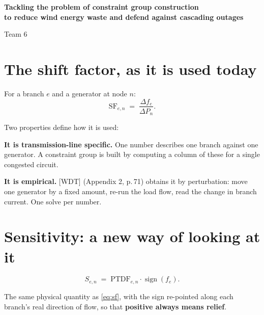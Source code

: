 \documentclass[11pt,a4paper]{article}
\begin{document}
\thispagestyle{empty}
\vspace*{\fill}
\begin{center}
{\LARGE\bfseries Tackling the problem of constraint group construction\\[3mm]
to reduce wind energy waste and defend against cascading outages}

\vspace{10mm}
{\large Team 6}
\end{center}
\vspace*{\fill}
\newpage



\section{The shift factor, as it is used today}

For a branch $e$ and a generator at node $n$:
\begin{equation}
  \text{SF}_{e,n} \;=\; \frac{\Delta f_e}{\Delta P_n}.
  \label{eq:sf}
\end{equation}

Two properties define how it is used:

\medskip
\textbf{It is transmission-line specific.} One number describes one branch
against one generator. A constraint group is built by computing a column of
these for a single congested circuit.

\medskip
\textbf{It is empirical.} [WDT] (Appendix 2, p.\,71) obtains it by
perturbation: move one generator by a fixed amount, re-run the load flow, read
the change in branch current. One solve per number.

\newpage
\section{Sensitivity: a new way of looking at it}

\begin{equation}
  S_{e,n} \;=\; \text{PTDF}_{e,n}\cdot\operatorname{sign}(f_e).
  \label{eq:sens}
\end{equation}

The same physical quantity as \eqref{eq:sf}, with the sign re-pointed along
each branch's real direction of flow, so that \textbf{positive always means
relief}.
\end{document}
